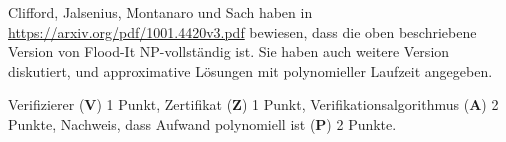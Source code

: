 \begin{diskussion}
Clifford, Jalsenius, Montanaro und Sach haben in
\url{https://arxiv.org/pdf/1001.4420v3.pdf} bewiesen, dass die oben
beschriebene Version von Flood-It NP-vollständig ist.
Sie haben auch weitere Version diskutiert, und approximative Lösungen
mit polynomieller Laufzeit angegeben.
\end{diskussion}

\begin{bewertung}
Verifizierer ({\bf V}) 1 Punkt,
Zertifikat ({\bf Z}) 1 Punkt,
Verifikationsalgorithmus ({\bf A}) 2 Punkte,
Nachweis, dass Aufwand polynomiell ist ({\bf P}) 2 Punkte.
\end{bewertung}

